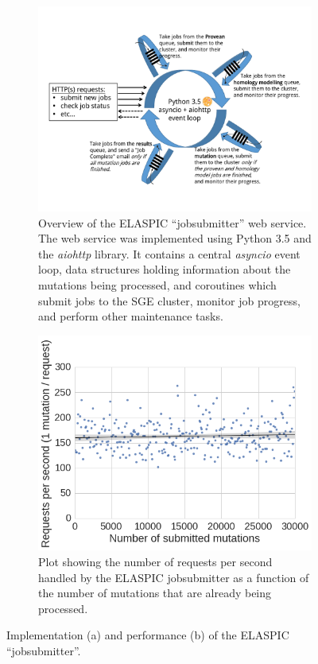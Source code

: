 \begin{figure}[!htb]
	\centering

	\begin{subfigure}{0.8\textwidth}
		\centering
		\includegraphics[width=1\linewidth]{static/elaspic/elaspic_jobsubmitter.pdf}
		\caption{Overview of the ELASPIC ``jobsubmitter'' web service. The web service was implemented using Python 3.5 and the \textit{aiohttp} library. It contains a central \textit{asyncio} event loop, data structures holding information about the mutations being processed, and coroutines which submit jobs to the SGE cluster, monitor job progress, and perform other maintenance tasks.}
		\label{fig:elaspic_jobsubmitter}
	\end{subfigure}
	\vspace*{10mm}

	\begin{subfigure}[t]{0.8\textwidth}
		\centering
		\includegraphics[width=0.7\linewidth]{static/elaspic/elaspic_jobsubmitter_performance.png}
		\caption{Plot showing the number of requests per second handled by the ELASPIC jobsubmitter as a function of the number of mutations that are already being processed.}
		\label{fig:elaspic_jobsubmitter_performance}
	\end{subfigure}
	\vspace*{5mm}

	\caption[ELASPIC jobsubmitter.]{
	Implementation (a) and performance (b) of the ELASPIC ``jobsubmitter''.
	}
	\label{fig:ELASPIC jobsubmitter}

\end{figure}



